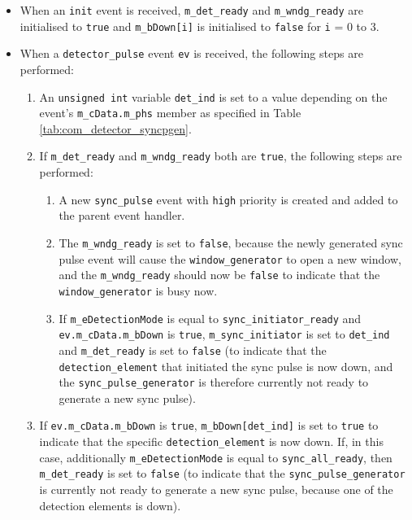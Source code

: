 \begin{itemize}

\item When an \texttt{init} event is received, \texttt{m\_det\_ready} and \texttt{m\_wndg\_ready} are initialised to \texttt{true} and \texttt{m\_bDown[i]} is initialised to \texttt{false} for \texttt{i} = 0 to 3.

\item When a \texttt{detector\_pulse} event \texttt{ev} is received, the following steps are performed:

\begin{enumerate}

\item An \texttt{unsigned int} variable \texttt{det\_ind} is set to a value depending on the event's \texttt{m\_cData.m\_phs} member as specified in Table \ref{tab:com_detector_syncpgen}.

\item If \texttt{m\_det\_ready} and \texttt{m\_wndg\_ready} both are \texttt{true}, the following steps are performed:

\begin{enumerate}

\item A new \texttt{sync\_pulse} event with \texttt{high} priority is created and added to the parent event handler.

\item The \texttt{m\_wndg\_ready} is set to \texttt{false}, because the newly generated sync pulse event will cause the \texttt{window\_generator} to open a new window, and the \texttt{m\_wndg\_ready} should now be \texttt{false} to indicate that the \texttt{window\_generator} is busy now.

\item If \texttt{m\_eDetectionMode} is equal to \texttt{sync\_initiator\_ready} and \texttt{ev.m\_cData.m\_bDown} is \texttt{true}, \texttt{m\_sync\_initiator} is set to \texttt{det\_ind} and \texttt{m\_det\_ready} is set to \texttt{false} (to indicate that the \texttt{detection\_element} that initiated the sync pulse is now down, and the \texttt{sync\_pulse\_generator} is therefore currently not ready to generate a new sync pulse).

\end{enumerate}

\item If \texttt{ev.m\_cData.m\_bDown} is \texttt{true}, \texttt{m\_bDown[det\_ind]} is set to \texttt{true} to indicate that the specific \texttt{detection\_element} is now down. If, in this case, additionally \texttt{m\_eDetectionMode} is equal to \texttt{sync\_all\_ready}, then \texttt{m\_det\_ready} is set to \texttt{false} (to indicate that the \texttt{sync\_pulse\_generator} is currently not ready to generate a new sync pulse, because one of the detection elements is down).


\end{enumerate}
\end{itemize}
